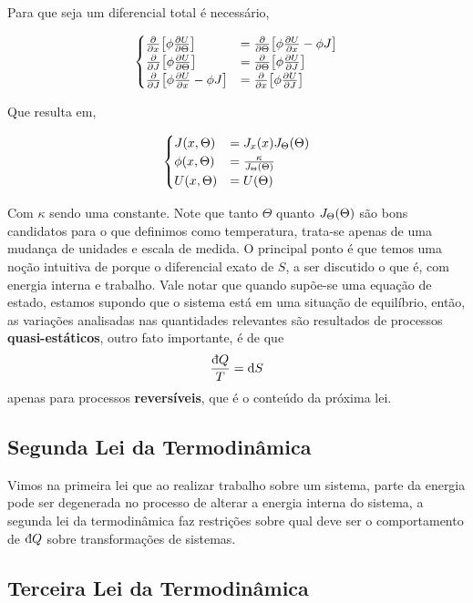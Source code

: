 \documentclass[twoside]{amsart}
\newcommand{\dbar}{\mbox{\dj}}
\numberwithin{equation}{section}
\begin{document}
\begin{refsection}
Para que seja um diferencial total é necessário,

\begin{align}
    \begin{cases}\pdv{}{x}\qty[\phi\pdv{U}{\Theta}]&=\pdv{}      
        {\Theta}\qty[\phi\pdv{U}{x}-\phi J]\\
        \pdv{}{J}\qty[\phi\pdv{U}{\Theta}]&=\pdv{}{\Theta}\qty[\phi\pdv{U}{J}]\\
        \pdv{}{J}\qty[\phi\pdv{U}{x}-\phi J]&=\pdv{}{x}\qty[\phi\pdv{U}{J}]
    \end{cases}
\end{align}

Que resulta em,

\begin{align}
    \begin{cases}
        J\qty(x,\Theta)&=J_x\qty(x)J_\Theta\qty(\Theta)\\
        \phi\qty(x,\Theta)&=\frac{\kappa}{J_\Theta\qty(\Theta)}\\
        U\qty(x,\Theta)&=U\qty(\Theta)
    \end{cases}
\end{align}

Com $\kappa$ sendo uma constante. Note que tanto $\Theta$ quanto $J_\Theta\qty(\Theta)$ são bons candidatos para o que definimos como temperatura, 
trata-se apenas de uma mudança de unidades e escala de medida. O principal ponto é que temos uma noção intuitiva de porque o diferencial exato de $S$, 
a ser discutido o que é, com energia interna e trabalho. Vale notar que quando supõe-se uma equação de estado, estamos supondo que o sistema está em 
uma situação de equilíbrio, então, as variações analisadas nas quantidades relevantes são resultados de processos \textbf{quasi-estáticos}, outro fato 
importante, é de que $$\frac{\dbar Q}{T}=\dd{S}$$ apenas para processos \textbf{reversíveis}, que é o conteúdo da próxima lei.

\subsection{Segunda Lei da Termodinâmica}

Vimos na primeira lei que ao realizar trabalho sobre um sistema, parte da energia pode ser degenerada no processo de 
alterar a energia interna do sistema, a segunda lei da termodinâmica faz restrições sobre qual deve ser o comportamento 
de $\dbar Q$ sobre transformações de sistemas.

\subsection{Terceira Lei da Termodinâmica}

\printbibliography[heading=subbibliography]
\end{refsection}
\end{document}
